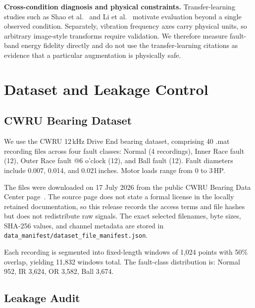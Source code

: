 ﻿\documentclass[11pt,a4paper]{article}
\begin{document}
\textbf{Cross-condition diagnosis and physical constraints.} Transfer-learning studies such as Shao et al.~\cite{shao2019highly} and Li et al.~\cite{li2020diagnosing} motivate evaluation beyond a single observed condition. Separately, vibration frequency axes carry physical units, so arbitrary image-style transforms require validation. We therefore measure fault-band energy fidelity directly and do not use the transfer-learning citations as evidence that a particular augmentation is physically safe.

\section{Dataset and Leakage Control}

\subsection{CWRU Bearing Dataset}

We use the CWRU 12\,kHz Drive End bearing dataset, comprising 40 .mat recording files across four fault classes: Normal (4 recordings), Inner Race fault (12), Outer Race fault @6 o'clock (12), and Ball fault (12). Fault diameters include 0.007, 0.014, and 0.021\,inches. Motor loads range from 0 to 3\,HP.

The files were downloaded on 17 July 2026 from the public CWRU Bearing Data Center page~\cite{cwru}. The source page does not state a formal license in the locally retained documentation, so this release records the access terms and file hashes but does not redistribute raw signals. The exact selected filenames, byte sizes, SHA-256 values, and channel metadata are stored in \texttt{data\_manifest/dataset\_file\_manifest.json}.

Each recording is segmented into fixed-length windows of 1,024 points with 50\% overlap, yielding 11,832 windows total. The fault-class distribution is: Normal 952, IR 3,624, OR 3,582, Ball 3,674.

\subsection{Leakage Audit}
\end{document}
